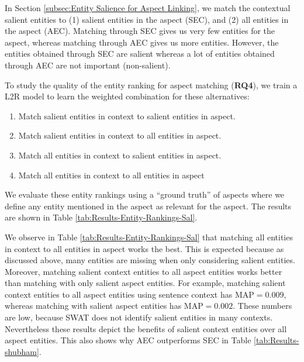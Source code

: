In Section \ref{subsec:Entity Salience for Aspect Linking}, we match the contextual salient entities to (1) salient entities in the aspect (SEC), and (2) all entities in the aspect (AEC). Matching through SEC gives us very few entities for the aspect, whereas matching through AEC gives us more entities. However, the entities obtained through SEC are salient whereas a lot of entities obtained through AEC are not important (non-salient). 

To study the quality of the entity ranking for aspect matching (\textbf{RQ4}), we train a L2R model to learn the weighted combination for these alternatives:
\begin{enumerate}
    \item Match salient entities in context to salient entities in aspect.
    \item Match salient entities in context to all entities in aspect.
    \item Match all entities in context to salient entities in aspect.
    \item Match all entities in context to all entities in aspect
\end{enumerate}


We evaluate these entity rankings using a ``ground truth'' of aspects where we define any entity mentioned in the aspect as relevant for the aspect. The results are shown in Table \ref{tab:Results-Entity-Rankings-Sal}. 



We observe in Table \ref{tab:Results-Entity-Rankings-Sal} that matching all entities in context to all entities in aspect works the best. This is expected because as discussed above, many entities are missing when only considering salient entities. Moreover, matching salient context entities to all aspect entities works better than matching with only salient aspect entities. For example, matching salient context entities to all aspect entities using sentence context has $\text{MAP}=0.009$, whereas matching with salient aspect entities has $\text{MAP}=0.002$. These numbers are low, because SWAT does not identify salient entities in many contexts. Nevertheless  these results depict the benefits of salient context entities over all aspect entities. This also shows why AEC outperforms SEC in Table \ref{tab:Results-shubham}.

